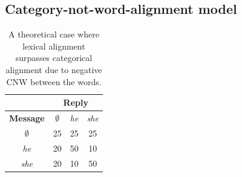 \documentclass[11pt]{article}
\begin{document}




\subsection{Category-not-word-alignment model}

\begin{table}[t]
\begin{center}
\begin{tabular}{|c||c|c|c|}
\hline
& \multicolumn{3}{|c|}{\bf Reply} \\
\hline
\bf Message & $\emptyset$ & \textit{he} & \textit{she} \\ \hline
$\emptyset$ & 25 & 25 & 25\\
\textit{he} & 20 & 50 & 10 \\
\textit{she} & 20 & 10 & 50 \\
\hline
\end{tabular}
\end{center}
\caption{\label{table:cnw-example1} A theoretical case where lexical alignment surpasses categorical alignment due to negative CNW between the words.}
\end{table}
\end{document}
